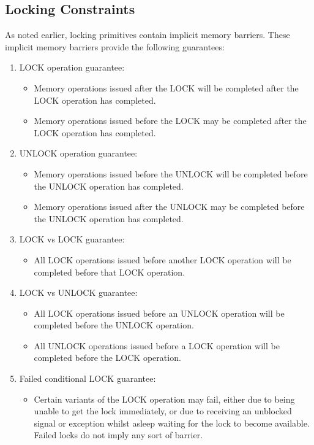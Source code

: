 \subsection{Locking Constraints}
\label{sec:advsync:Locking Constraints}

As noted earlier, locking primitives contain implicit memory barriers.
These implicit memory barriers provide the following guarantees:
\begin{enumerate}
\item	LOCK operation guarantee:
	\begin{itemize}
	\item	Memory operations issued after the LOCK will be completed
		after the LOCK operation has completed.
	\item	Memory operations issued before the LOCK may be completed
		after the LOCK operation has completed.
	\end{itemize}
\item	UNLOCK operation guarantee:
	\begin{itemize}
	\item	Memory operations issued before the UNLOCK will be
		completed before the UNLOCK operation has completed.
	\item	Memory operations issued after the UNLOCK may be completed
		before the UNLOCK operation has completed.
	\end{itemize}
\item	LOCK vs LOCK guarantee:
	\begin{itemize}
	\item	All LOCK operations issued before another LOCK operation
		will be completed before that LOCK operation.
	\end{itemize}
\item	LOCK vs UNLOCK guarantee:
	\begin{itemize}
	\item	All LOCK operations issued before an UNLOCK operation
		will be completed before the UNLOCK operation.
	\item	All UNLOCK operations issued before a LOCK operation
		will be completed before the LOCK operation.
	\end{itemize}
\item	Failed conditional LOCK guarantee:
	\begin{itemize}
	\item	Certain variants of the LOCK operation may fail, either
		due to being unable to get the lock immediately, or due
		to receiving an unblocked signal or exception
		whilst asleep waiting
		for the lock to become available.  Failed locks do not
		imply any sort of barrier.
	\end{itemize}
\end{enumerate}

